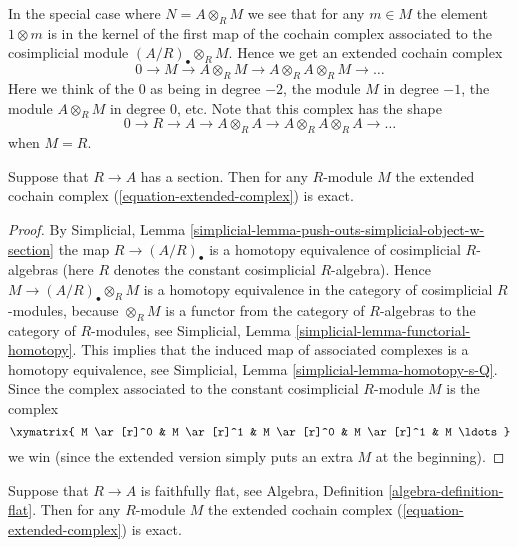 \medskip\noindent
In the special case
where $N = A \otimes_R M$ we see that for any $m \in M$
the element $1 \otimes m$ is in the kernel of the first map
of the cochain complex associated to the cosimplicial
module $(A/R)_\bullet \otimes_R M$. Hence we get an extended cochain complex
\begin{equation}
\label{equation-extended-complex}
0 \to M \to A \otimes_R M \to A \otimes_R A \otimes_R M \to \ldots
\end{equation}
Here we think of the $0$ as being in degree $-2$,
the module $M$ in degree $-1$, the module $A \otimes_R M$ in
degree $0$, etc. Note that this complex has the shape
$$
0 \to R \to A \to A \otimes_R A \to A \otimes_R A \otimes_R A \to \ldots
$$
when $M = R$.

\begin{lemma}
\label{lemma-with-section-exact}
Suppose that $R \to A$ has a section.
Then for any $R$-module $M$ the extended cochain complex
(\ref{equation-extended-complex}) is exact.
\end{lemma}

\begin{proof}
By
Simplicial, Lemma \ref{simplicial-lemma-push-outs-simplicial-object-w-section}
the map $R \to (A/R)_\bullet$ is a homotopy equivalence
of cosimplicial $R$-algebras
(here $R$ denotes the constant cosimplicial $R$-algebra).
Hence $M \to (A/R)_\bullet \otimes_R M$ is
a homotopy equivalence in the category of cosimplicial
$R$-modules, because $\otimes_R M$ is a
functor from the category of $R$-algebras to the category
of $R$-modules, see
Simplicial, Lemma \ref{simplicial-lemma-functorial-homotopy}.
This implies that the induced map of associated
complexes is a homotopy equivalence, see
Simplicial, Lemma \ref{simplicial-lemma-homotopy-s-Q}.
Since the complex associated to the constant cosimplicial
$R$-module $M$ is the complex
$$
\xymatrix{
M \ar[r]^0 & M \ar[r]^1 & M \ar[r]^0 & M \ar[r]^1 & M \ldots
}
$$
we win (since the extended version simply puts an extra $M$ at
the beginning).
\end{proof}

\begin{lemma}
\label{lemma-ff-exact}
Suppose that $R \to A$ is faithfully flat, see
Algebra, Definition \ref{algebra-definition-flat}.
Then for any $R$-module $M$ the extended cochain complex
(\ref{equation-extended-complex}) is exact.
\end{lemma}


